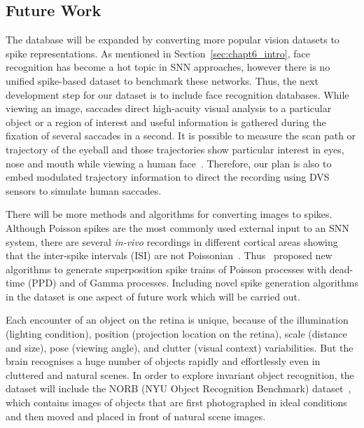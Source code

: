 
\subsection{Future Work}
The database will be expanded by converting more popular vision datasets to spike representations.
As mentioned in Section~\ref{sec:chapt6_intro}, face recognition has become a hot topic in SNN approaches, however there is no unified spike-based dataset to benchmark these networks.
Thus, the next development step for our dataset is to include face recognition databases.
While viewing an image, saccades direct high-acuity visual analysis to a particular object or a region of interest and useful information is gathered during the fixation of several saccades in a second.
It is possible to measure the scan path or trajectory of the eyeball and those trajectories show particular interest in eyes, nose and mouth while viewing a human face~\cite{yarbus1967eye}.
Therefore, our plan is also to embed modulated trajectory information to direct the recording using DVS sensors to simulate human saccades.

There will be more methods and algorithms for converting images to spikes.
Although Poisson spikes are the most commonly used external input to an SNN system, there are several \textit{in-vivo} recordings in different cortical areas showing that the inter-spike intervals (ISI) are not Poissonian~\cite{deger2012statistical}. 
Thus~\cite{deger2012statistical} proposed new algorithms to generate superposition spike trains of Poisson processes with dead-time (PPD) and of Gamma processes.
Including novel spike generation algorithms in the dataset is one aspect of future work which will be carried out.

Each encounter of an object on the retina is unique, because of the illumination (lighting condition), position (projection location on the retina), scale (distance and size), pose (viewing angle), and clutter (visual context) variabilities.
But the brain recognises a huge number of objects rapidly and effortlessly even in cluttered and natural scenes.
In order to explore invariant object recognition, the dataset will include the NORB (NYU Object Recognition Benchmark) dataset~\cite{lecun2004learning}, which contains images of objects that are first photographed in ideal conditions and then moved and placed in front of natural scene images.

